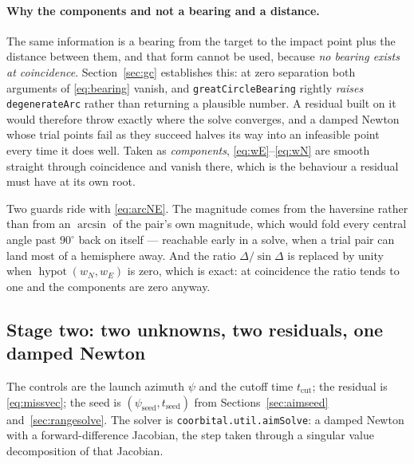 \documentclass[11pt]{article}
\newcommand{\code}[1]{\texttt{#1}}
\begin{document}
\paragraph{Why the components and not a bearing and a distance.} The same
information is a bearing from the target to the impact point plus the distance
between them, and that form cannot be used, because \emph{no bearing exists at
coincidence}. Section~\ref{sec:gc} establishes this: at zero separation both
arguments of \eqref{eq:bearing} vanish, and \code{greatCircleBearing} rightly
\emph{raises} \code{degenerateArc} rather than returning a plausible number.
A residual built on it would therefore throw exactly where the solve
converges, and a damped Newton whose trial points fail as they succeed halves
its way into an infeasible point every time it does well. Taken as
\emph{components}, \eqref{eq:wE}--\eqref{eq:wN} are smooth straight through
coincidence and vanish there, which is the behaviour a residual must have at
its own root.

Two guards ride with \eqref{eq:arcNE}. The magnitude comes from the haversine
rather than from an $\arcsin$ of the pair's own magnitude, which would fold
every central angle past $90^{\circ}$ back on itself --- reachable early in a solve, when a trial
pair can land most of a hemisphere away. And the ratio $\Delta/\sin\Delta$ is
replaced by unity when $\operatorname{hypot}(w_N,w_E)$ is zero, which is exact:
at coincidence the ratio tends to one and the components are zero anyway.

\subsection{Stage two: two unknowns, two residuals, one damped Newton}
\label{sec:twoaxis}

The controls are the launch azimuth $\psi$ and the cutoff time
$t_{\text{cut}}$; the residual is \eqref{eq:missvec}; the seed is
$(\psi_{\text{seed}},t_{\text{seed}})$ from Sections~\ref{sec:aimseed}
and~\ref{sec:rangesolve}. The solver is \code{coorbital.util.aimSolve}: a
damped Newton with a forward-difference Jacobian, the step taken through a
singular value decomposition of that Jacobian.
\end{document}
